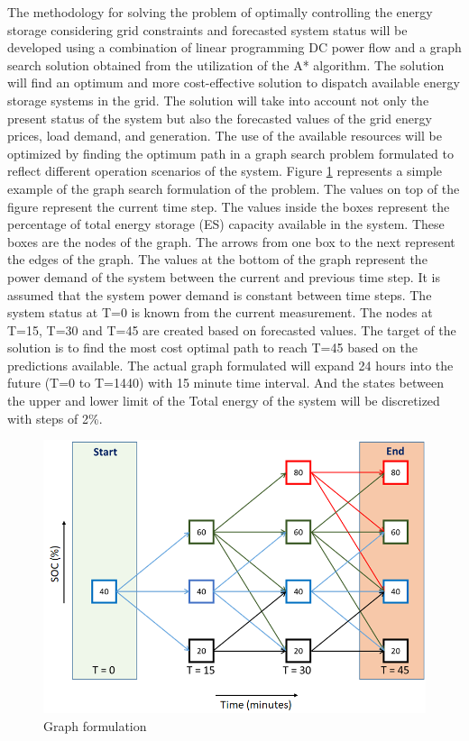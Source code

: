 \documentclass[journal,12pt,onecolumn]{IEEEtran}
\begin{document}
The methodology for solving the problem of optimally controlling the energy storage considering grid constraints and forecasted system status will be developed using a combination of linear programming DC power flow and a graph search solution obtained from the utilization of the A* \cite{a8book} algorithm. The solution will find an optimum and more cost-effective solution to dispatch available energy storage systems in the grid. The solution will take into account not only the present status of the system but also the forecasted values of the grid energy prices, load demand, and generation. The use of the available resources will be optimized by finding the optimum path in a graph search problem formulated to reflect different operation scenarios of the system. Figure \ref{fig:F1_1_Dis} represents a simple example of the graph search formulation of the problem. The values on top of the figure represent the current time step. The values inside the boxes represent the percentage of total energy storage (ES) capacity available in the system. These boxes are the nodes of the graph. The arrows from one box to the next represent the edges of the graph. The values at the bottom of the graph represent the power demand of the system between the current and previous time step. It is assumed that the system power demand is constant between time steps. The system status at T=0 is known from the current measurement. The nodes at T=15, T=30 and T=45 are created based on forecasted values. The target of the solution is to find the most cost optimal path to reach T=45 based on the predictions available. The actual graph formulated will expand 24 hours into the future (T=0 to T=1440) with 15 minute time interval. And the states between the upper and lower limit of the Total energy of the system will be discretized with steps of 2\%.

\begin{figure}[!ht]
\centering
\includegraphics[width = 0.5\linewidth]{figs/F1_1_Dis.png}
\caption{Graph formulation}
\label{fig:F1_1_Dis}
\end{figure}
\end{document}
